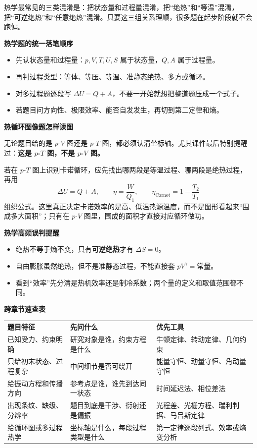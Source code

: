 \documentclass[lang=cn,11pt]{elegantbook}
\begin{document}
\begin{remark}
热学最常见的三类混淆是：把状态量和过程量混淆，把“绝热”和“等温”混淆，把“可逆绝热”和“任意绝热”混淆。只要这三组关系理顺，很多题在起步阶段就不会跑偏。
\end{remark}

\textbf{热学题的统一落笔顺序}

\begin{itemize}
 \item 先认状态量和过程量：\(p,V,T,U,S\) 属于状态量，\(Q,A\) 属于过程量。
 \item 再判过程类型：等体、等压、等温、准静态绝热、多方或循环。
 \item 对多过程题逐段写 \(\Delta U=Q+A\)，不要一开始就想把整道题压成一个式子。
 \item 若题目问方向性、极限效率、能否自发发生，再切到第二定律和熵。
\end{itemize}

\textbf{热循环图像题怎样读图}

无论题目给的是 \(p\)-\(V\) 图还是 \(p\)-\(T\) 图，都必须认清坐标轴。尤其课件最后特别提醒过：\textbf{这是 \(p\)-\(T\) 图，不是 \(p\)-\(V\) 图。}

若在 \(p\)-\(T\) 图上识别卡诺循环，应先找出哪两段是等温过程、哪两段是绝热过程，再用
\[
\Delta U=Q+A,\qquad \eta=\frac{W}{Q_1},\qquad \eta_{\text{Carnot}}=1-\frac{T_2}{T_1}
\]
组织公式。这里真正决定卡诺效率的是高、低温热源温度，而不是图形看起来“围成多大面积”；只有在 \(p\)-\(V\) 图里，围成的面积才直接对应循环做功。

\textbf{热学高频误判提醒}

\begin{itemize}
 \item 绝热不等于熵不变，只有\textbf{可逆绝热}才有 \(\Delta S=0\)。
 \item 自由膨胀虽然绝热，但不是准静态过程，不能直接套 \(pV^\gamma=\text{常量}\)。
 \item 看到“效率”先分清是热机效率还是制冷系数；两个量的定义和取值范围都不同。
\end{itemize}

\textbf{跨章节速查表}

\begin{center}
\renewcommand{\arraystretch}{1.2}
\begin{tabular}{>{\raggedright\arraybackslash}p{} >{\raggedright\arraybackslash}p{} >{\raggedright\arraybackslash}p{}}
\textbf{题目特征} & \textbf{先问什么} & \textbf{优先工具} \\
已知受力、约束明确 & 研究对象是谁，约束方程是什么 & 牛顿定律、转动定律、几何约束 \\
只给初末状态、过程复杂 & 中间细节是否可绕开 & 能量守恒、动量守恒、角动量守恒 \\
给振动方程和传播方向 & 参考点是谁，谁先到达同一状态 & 时间延迟法、相位差法 \\
出现条纹、缺级、分辨率 & 题目到底是干涉、衍射还是偏振 & 光程差、光栅方程、瑞利判据、马吕斯定律 \\
给循环图或多过程热学 & 坐标轴是什么，每段过程类型是什么 & 第一定律逐段列式、效率或熵变分析 \\
\end{tabular}
\end{center}
\end{document}
